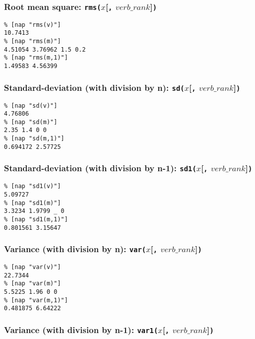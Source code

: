  \subsubsection{
    \label{rms}Root mean square: \texttt{rms(}$x$[\texttt{,} $verb\_rank$]\texttt{)}
  }

  \begin{verbatim}
% [nap "rms(v)"]
10.7413
% [nap "rms(m)"]
4.51054 3.76962 1.5 0.2
% [nap "rms(m,1)"]
1.49583 4.56399
\end{verbatim}

  \subsubsection{
    \label{sd}Standard-deviation (with division by n): \texttt{sd(}$x$[\texttt{,} $verb\_rank$]\texttt{)}
  }

  \begin{verbatim}
% [nap "sd(v)"]
4.76806
% [nap "sd(m)"]
2.35 1.4 0 0
% [nap "sd(m,1)"]
0.694172 2.57725
\end{verbatim}

  \subsubsection{
    \label{sd1}Standard-deviation (with division by n-1): \texttt{sd1(}$x$[\texttt{,} $verb\_rank$]\texttt{)}
  }

  \begin{verbatim}
% [nap "sd1(v)"]
5.09727
% [nap "sd1(m)"]
3.3234 1.9799 _ 0
% [nap "sd1(m,1)"]
0.801561 3.15647
\end{verbatim}

  \subsubsection{
    \label{var}Variance (with division by n): \texttt{var(}$x$[\texttt{,} $verb\_rank$]\texttt{)}
  }

  \begin{verbatim}
% [nap "var(v)"]
22.7344
% [nap "var(m)"]
5.5225 1.96 0 0
% [nap "var(m,1)"]
0.481875 6.64222
\end{verbatim}

  \subsubsection{
    \label{var1}Variance (with division by n-1): \texttt{var1(}$x$[\texttt{,} $verb\_rank$]\texttt{)}
  }

